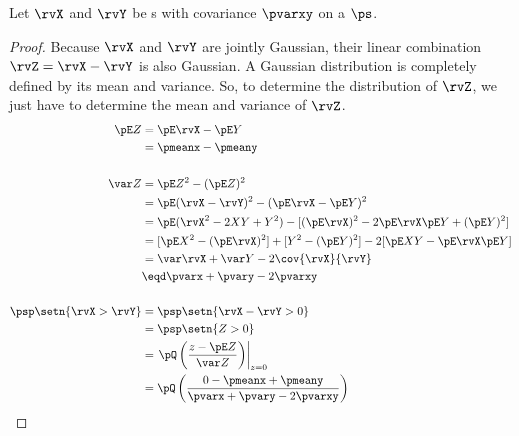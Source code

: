 \begin{proposition}
Let $\rvX$ and $\rvY$ be s
with covariance $\pvarxy$ on a
 $\ps$.
\end{proposition}
\begin{proof}
Because $\rvX$ and $\rvY$ are jointly Gaussian,
their linear combination $\rvZ=\rvX-\rvY$ is also Gaussian.
A Gaussian distribution is completely defined by its mean and variance.
So, to determine the distribution of $\rvZ$,
we just have to determine the mean and variance of $\rvZ$.
\begin{align*}
  \pE Z
    &= \pE\rvX - \pE Y
  \\&= \pmeanx - \pmeany
\\
\\
  \var Z
    &= \pE Z^2 - (\pE Z)^2
  \\&= \pE (\rvX-\rvY)^2 - (\pE\rvX - \pE Y)^2
  \\&= \pE (\rvX^2-2XY+Y^2) - [(\pE\rvX)^2 -2\pE\rvX \pE Y + (\pE Y)^2 ]
  \\&= [\pE X^2- (\pE\rvX)^2]  + [Y^2- (\pE Y)^2] - 2[\pE XY - \pE\rvX \pE Y]
  \\&= \var\rvX + \var Y - 2\cov{\rvX}{\rvY}
  \\&\eqd \pvarx + \pvary -2\pvarxy
\\
\\
  \psp\setn{\rvX>\rvY}
    &= \psp\setn{\rvX-\rvY>0}
  \\&= \psp\setn{Z>0}
  \\&= \left.\pQ\left(\frac{z-\pE Z}{\var Z} \right)\right|_{z=0}
  \\&= \pQ\left(\frac{0-\pmeanx+\pmeany}{\pvarx+\pvary-2\pvarxy} \right)
\end{align*}
\end{proof}

